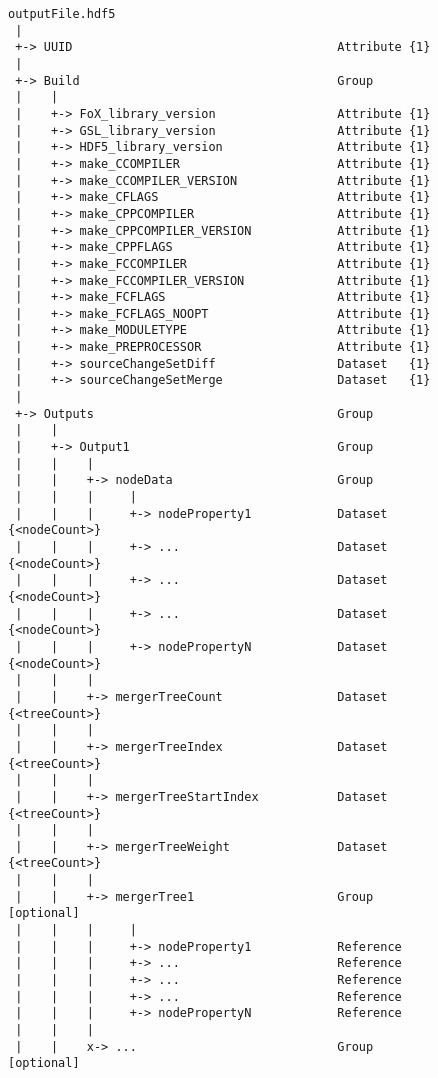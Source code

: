 \begin{figure}
\begin{center}
\begin{verbatim}
outputFile.hdf5
 |
 +-> UUID                                     Attribute {1}
 |
 +-> Build                                    Group
 |    |
 |    +-> FoX_library_version                 Attribute {1}
 |    +-> GSL_library_version                 Attribute {1}
 |    +-> HDF5_library_version                Attribute {1}
 |    +-> make_CCOMPILER                      Attribute {1}
 |    +-> make_CCOMPILER_VERSION              Attribute {1}
 |    +-> make_CFLAGS                         Attribute {1}
 |    +-> make_CPPCOMPILER                    Attribute {1}
 |    +-> make_CPPCOMPILER_VERSION            Attribute {1}
 |    +-> make_CPPFLAGS                       Attribute {1}
 |    +-> make_FCCOMPILER                     Attribute {1}
 |    +-> make_FCCOMPILER_VERSION             Attribute {1}
 |    +-> make_FCFLAGS                        Attribute {1}
 |    +-> make_FCFLAGS_NOOPT                  Attribute {1}
 |    +-> make_MODULETYPE                     Attribute {1}
 |    +-> make_PREPROCESSOR                   Attribute {1}
 |    +-> sourceChangeSetDiff                 Dataset   {1}
 |    +-> sourceChangeSetMerge                Dataset   {1}
 |
 +-> Outputs                                  Group
 |    |
 |    +-> Output1                             Group
 |    |    |
 |    |    +-> nodeData                       Group
 |    |    |     |
 |    |    |     +-> nodeProperty1            Dataset {<nodeCount>}
 |    |    |     +-> ...                      Dataset {<nodeCount>}
 |    |    |     +-> ...                      Dataset {<nodeCount>}
 |    |    |     +-> ...                      Dataset {<nodeCount>}
 |    |    |     +-> nodePropertyN            Dataset {<nodeCount>}
 |    |    |
 |    |    +-> mergerTreeCount                Dataset {<treeCount>}
 |    |    |
 |    |    +-> mergerTreeIndex                Dataset {<treeCount>}
 |    |    |
 |    |    +-> mergerTreeStartIndex           Dataset {<treeCount>}
 |    |    |
 |    |    +-> mergerTreeWeight               Dataset {<treeCount>}
 |    |    |
 |    |    +-> mergerTree1                    Group              [optional]
 |    |    |     |
 |    |    |     +-> nodeProperty1            Reference
 |    |    |     +-> ...                      Reference
 |    |    |     +-> ...                      Reference
 |    |    |     +-> ...                      Reference
 |    |    |     +-> nodePropertyN            Reference
 |    |    |
 |    |    x-> ...                            Group              [optional]

\end{verbatim}
\end{center}
\end{figure}
